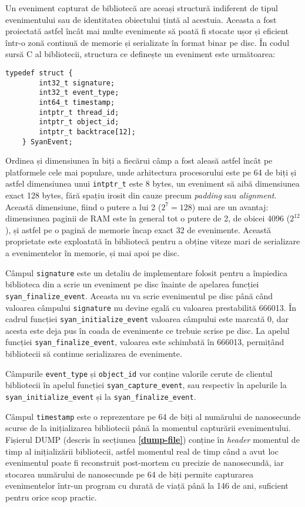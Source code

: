 Un eveniment capturat de bibliotecă are aceași structură indiferent de
tipul evenimentului sau de identitatea obiectului țintă al acestuia.
Aceasta a fost proiectată astfel încât mai multe evenimente să poată fi
stocate ușor și eficient într-o zonă continuă de memorie și serializate
în format binar pe disc. În codul sursă C al bibliotecii, structura ce
definește un eveniment este următoarea:
\begin{lstlisting}[caption=Structura unui eveniment capturat]
    typedef struct {
        int32_t signature;
        int32_t event_type;
        int64_t timestamp;
        intptr_t thread_id;
        intptr_t object_id;
        intptr_t backtrace[12];
    } SyanEvent;
\end{lstlisting}

Ordinea și dimensiunea în biți a fiecărui câmp a fost aleasă astfel
încât pe platformele cele mai populare, unde arhitectura procesorului
este pe 64 de biți și astfel dimensiunea unui \lstinline{intptr_t} este
8 bytes, un eveniment să aibă dimensiunea exact 128 bytes, fără spațiu
irosit din cauze precum \textit{padding} sau \textit{alignment}. Această
dimensiune, fiind o putere a lui 2 ($2^7=128$) mai are un avantaj:
dimensiunea paginii de RAM este în general tot o putere de 2, de obicei
4096 ($2^{12}$), și astfel pe o pagină de memorie încap exact 32 de
evenimente. Această proprietate este exploatată în bibliotecă pentru a
obține viteze mari de serializare a evenimentelor în memorie, și mai
apoi pe disc.

Câmpul \lstinline{signature} este un detaliu de implementare folosit
pentru a împiedica biblioteca din a scrie un eveniment pe disc înainte
de apelarea funcției \lstinline{syan_finalize_event}. Aceasta nu va
scrie evenimentul pe disc până când valoarea câmpului
\lstinline{signature} nu devine egală cu valoarea prestabilită 666013.
În cadrul funcției \lstinline{syan_initialize_event} valoarea câmpului
este marcată 0, dar acesta este deja pus în coada de evenimente ce
trebuie scrise pe disc. La apelul funcției
\lstinline{syan_finalize_event}, valoarea este schimbată în 666013,
permițând bibliotecii să continue serializarea de evenimente.

Câmpurile \lstinline{event_type} și \lstinline{object_id} vor conține
valorile cerute de clientul bibliotecii în apelul funcției
\lstinline{syan_capture_event}, sau respectiv în apelurile la
\lstinline{syan_initialize_event} și la \lstinline{syan_finalize_event}.

Câmpul \lstinline{timestamp} este o reprezentare pe 64 de biți al
numărului de nanosecunde scurse de la inițializarea bibliotecii până la
momentul capturării evenimentului. Fișierul DUMP (descris în secțiunea
\textbf{\ref{dump-file}}) conține în \textit{header} momentul de timp al
inițializării bibliotecii, astfel momentul real de timp când a avut loc
evenimentul poate fi reconstruit post-mortem cu precizie de nanosecundă,
iar stocarea numărului de nanosecunde pe 64 de biți permite capturarea
evenimentelor într-un program cu durată de viață până la 146 de ani,
suficient pentru orice scop practic.

